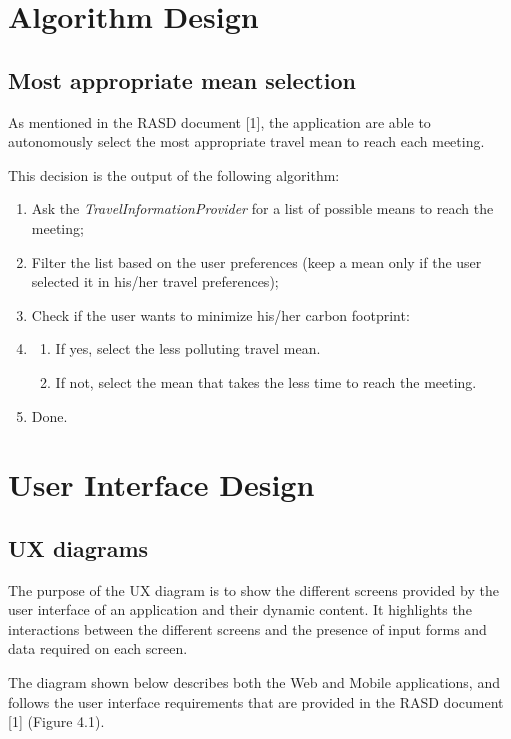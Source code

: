 \documentclass{article}
\begin{document}
	\section{Algorithm Design}

	\subsection{Most appropriate mean selection}
	As mentioned in the RASD document [1], the application are able to autonomously select the most appropriate travel mean to reach each meeting.

	This decision is the output of the following algorithm:
	\begin{enumerate}
	\item Ask the \textit{TravelInformationProvider} for a list of possible means to reach the meeting;
	\item Filter the list based on the user preferences (keep a mean only if the user selected it in his/her travel preferences);
	\item Check if the user wants to minimize his/her carbon footprint:
	\item \begin{enumerate}
		\item If yes, select the less polluting travel mean.
		\item If not, select the mean that takes the less time to reach the meeting.
		\end{enumerate}
	\item Done.
	\end{enumerate}


	\section{User Interface Design}


	\subsection{UX diagrams}

	The purpose of the UX diagram is to show the different screens provided by the user interface of an application and their dynamic content. It highlights the interactions between the different screens and the presence of input forms and data required on each screen.
 	
 	\bigskip
	The diagram shown below describes both the Web and Mobile applications, and follows the user interface requirements that are provided in the RASD document [1] (Figure 4.1).
 	
\end{document}
